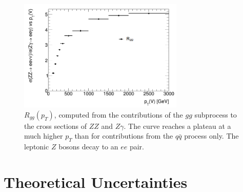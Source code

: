 \documentclass[12pt,a4paper,openright,twoside]{report}
\begin{document}
\begin{figure}[H]
\centering
\includegraphics[width=0.7\textwidth]{Rgg.png}
\caption{$R_{gg}(p_T)$, computed from the contributions of the $gg$ subprocess to the cross sections of $ZZ$ and $Z\gamma$. The curve reaches a plateau at a much higher $p_T$ than for contributions from the $q\bar{q}$ process only. The leptonic $Z$ bosons decay to an $ee$ pair.}
\label{fig:R_ggonly}
\end{figure}

\section{Theoretical Uncertainties}
\end{document}

